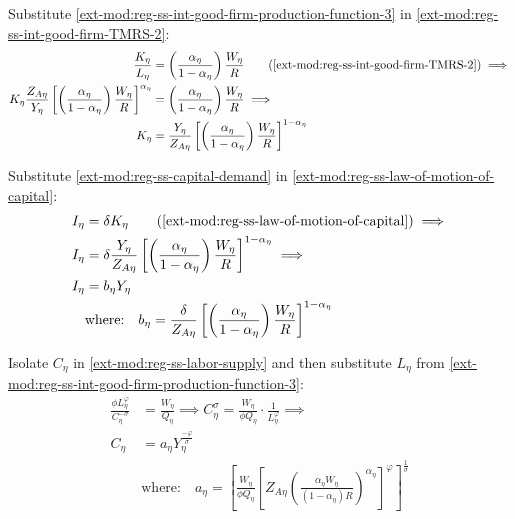 \documentclass[../thesis.tex]{subfiles}
\begin{document}

Substitute \ref{ext-mod:reg-ss-int-good-firm-production-function-3} in \ref{ext-mod:reg-ss-int-good-firm-TMRS-2}:
\begin{align}
	\frac{K_{\eta}}{L_{\eta}} &= \left( \frac{{\alpha_{\eta}}}{1-\alpha_{\eta}} \right) \frac{W_{\eta}}{R_{}} \tag{\ref{ext-mod:reg-ss-int-good-firm-TMRS-2}} \implies \\
	K_{\eta} \frac{Z_{A\eta}}{Y_{\eta}} \left[ \left( \frac{\alpha_{\eta}}{1-\alpha_{\eta}} \right) \frac{W_{\eta}}{R} \right]^{\alpha_{\eta}} &= \left( \frac{{\alpha_{\eta}}}{1-\alpha_{\eta}} \right) \frac{W_{\eta}}{R_{}} \implies \nonumber \\
	K_{\eta} &= \frac{Y_{\eta}}{Z_{A\eta}} \left[ \left( \frac{{\alpha_{\eta}}}{1-\alpha_{\eta}} \right) \frac{W_{\eta}}{R} \right]^{1 - \alpha_{\eta}} \label{ext-mod:reg-ss-capital-demand}
\end{align}


Substitute \ref{ext-mod:reg-ss-capital-demand} in \ref{ext-mod:reg-ss-law-of-motion-of-capital}:
\begin{align}
	I_{\eta} &= \delta K_{\eta} \tag{\ref{ext-mod:reg-ss-law-of-motion-of-capital}} \implies \\
	I_{\eta} &= \delta \frac{Y_{\eta}}{Z_{A\eta}} \left[ \left( \frac{{\alpha_{\eta}}}{1-\alpha_{\eta}} \right) \frac{W_{\eta}}{R} \right]^{1 - \alpha_{\eta}} \implies \\
	I_{\eta} &= b_{\eta} Y_{\eta} \label{ext-mod:reg-ss-law-of-motion-of-capital-2} \\
	& \text{where:} \quad b_{\eta} = \frac{\delta}{Z_{A\eta}} \left[ \left( \frac{{\alpha_{\eta}}}{1-\alpha_{\eta}} \right) \frac{W_{\eta}}{R} \right]^{1 - \alpha_{\eta}} \label{ext-mod:reg-ss-b-eta}
\end{align}

	
	Isolate $C_{\eta}$ in \ref{ext-mod:reg-ss-labor-supply} and then substitute $L_{\eta}$ from \ref{ext-mod:reg-ss-int-good-firm-production-function-3}:
	\begin{align}
		\frac{\phi L_{\eta}^{\varphi}}{C_{\eta}^{-\sigma}} &= \frac{W_{\eta}}{Q_{\eta}} \implies C_{\eta}^{\sigma} = \frac{W_{\eta}}{\phi Q_{\eta}} \cdot \frac{1}{L_{\eta}^{\varphi}} \implies \nonumber\\
		C_{\eta} &= a_{\eta} Y_{\eta}^{\frac{-\varphi}{\sigma}} \label{ext-mod:reg-ss-consumption} \\
		& \text{where:} \quad a_{\eta} = \left[ \frac{W_{\eta}}{\phi Q_{\eta}} \left[ Z_{A\eta} \left( \frac{\alpha_{\eta} W_{\eta}}{(1 - \alpha_{\eta}) R} \right)^{\alpha_{\eta}} \right]^{\varphi} \right]^{\frac{1}{\sigma}}  \label{ext-mod:reg-ss-a-eta}
	\end{align}
\end{document}
